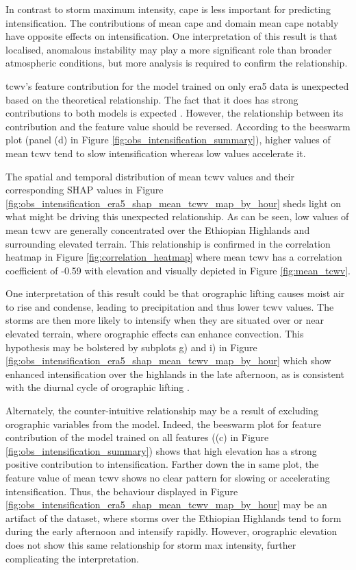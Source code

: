 In contrast to storm maximum intensity, \acrshort{cape} is less important for predicting intensification. The contributions of mean \acrshort{cape} and domain mean \acrshort{cape} notably have opposite effects on intensification. One interpretation of this result is that localised, anomalous instability may play a more significant role than broader atmospheric conditions, but more analysis is required to confirm the relationship.

\acrfull{tcwv}'s feature contribution for the model trained on only \acrshort{era5} data is unexpected based on the theoretical relationship. The fact that it does has strong contributions to both models is expected \citep{Li2023,Muetzelfeldt2025,Klein2020}. However, the relationship between its contribution and the feature value should be reversed. According to the beeswarm plot (panel (d) in Figure \ref{fig:obs_intensification_summary}), higher values of mean \acrshort{tcwv} tend to slow intensification whereas low values accelerate it.

The spatial and temporal distribution of mean \acrshort{tcwv} values and their corresponding SHAP values in Figure \ref{fig:obs_intensification_era5_shap_mean_tcwv_map_by_hour} sheds light on what might be driving this unexpected relationship. As can be seen, low values of mean \acrshort{tcwv} are generally concentrated over the Ethiopian Highlands and surrounding elevated terrain. This relationship is confirmed in the correlation heatmap in Figure \ref{fig:correlation_heatmap} where mean \acrshort{tcwv} has a correlation coefficient of -0.59 with elevation and visually depicted in Figure \ref{fig:mean_tcwv}.

One interpretation of this result could be that orographic lifting causes moist air to rise and condense, leading to precipitation and thus lower \acrshort{tcwv} values. The storms are then more likely to intensify when they are situated over or near elevated terrain, where orographic effects can enhance convection. This hypothesis may be bolstered by subplots g) and i) in Figure \ref{fig:obs_intensification_era5_shap_mean_tcwv_map_by_hour} which show enhanced intensification over the highlands in the late afternoon, as is consistent with the diurnal cycle of orographic lifting \citep{Colle2015,Negash2024,Zardi2013}.

Alternately, the counter-intuitive relationship may be a result of excluding orographic variables from the model. Indeed, the beeswarm plot for feature contribution of the model trained on all features ((c) in Figure \ref{fig:obs_intensification_summary}) shows that high elevation has a strong positive contribution to intensification. Farther down the in same plot, the feature value of mean \acrshort{tcwv} shows no clear pattern for slowing or accelerating intensification. Thus, the behaviour displayed in Figure \ref{fig:obs_intensification_era5_shap_mean_tcwv_map_by_hour} may be an artifact of the dataset, where storms over the Ethiopian Highlands tend to form during the early afternoon and intensify rapidly. However, orographic elevation does not show this same relationship for storm max intensity, further complicating the interpretation.

